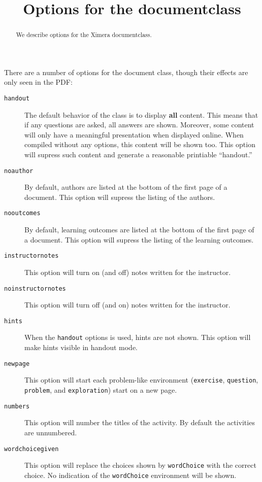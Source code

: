 \documentclass{ximera}
\title{Options for the documentclass}
\begin{document}
\begin{abstract}
  We describe options for the Ximera documentclass. 
\end{abstract}
\maketitle

There are a number of options for the document class, though their
effects are only seen in the PDF:

\begin{description}
\item[\texttt{handout}] The default behavior of the class is to display \textbf{all} content. This means that if any questions are asked, all answers are shown. Moreover, some content will only have a meaningful presentation when displayed online. When compiled without any options, this content will be shown too. This option will supress such content and generate a reasonable printiable ``handout.''
\item[\texttt{noauthor}] By default, authors are listed at the bottom of the first page of a document. This option will supress the listing of the authors.
\item[\texttt{nooutcomes}] By default, learning outcomes are listed at the bottom of the first page of a document. This option will supress the listing of the learning outcomes.
\item[\texttt{instructornotes}] This option will turn on (and off) notes written for the instructor.
\item[\texttt{noinstructornotes}] This option will turn off (and on) notes written for the instructor.
\item[\texttt{hints}] When the \texttt{handout} options is used, hints are not shown. This option will make hints visible in handout mode.
\item[\texttt{newpage}] This option will start each problem-like environment (\texttt{exercise}, \texttt{question}, \texttt{problem}, and \texttt{exploration}) start on a new page.
\item[\texttt{numbers}] This option will number the titles of the activity. By default the activities are unnumbered.
\item[\texttt{wordchoicegiven}] This option will replace the choices shown by \texttt{wordChoice} with the correct choice. No indication of the \texttt{wordChoice} environment will be shown.
\end{description}
\end{document}
